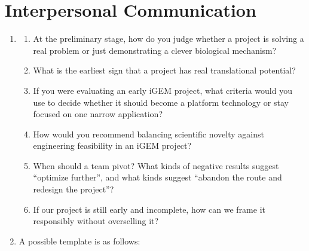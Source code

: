 \documentclass[12pt,a4paper]{article}
\begin{document}
\section{Interpersonal Communication}
\begin{enumerate}[parsep=0.5\baselineskip] 
  \item 
  \begin{enumerate}
    \item At the preliminary stage, how do you judge whether a project is solving a real problem or just demonstrating a clever biological mechanism?
    \item What is the earliest sign that a project has real translational potential?
    \item If you were evaluating an early iGEM project, what criteria would you use to decide whether it should become a platform technology or stay focused on one narrow application?
    \item How would you recommend balancing scientific novelty against engineering feasibility in an iGEM project?
    \item When should a team pivot? What kinds of negative results suggest ``optimize further'', and what kinds suggest ``abandon the route and redesign the project''?
    \item If our project is still early and incomplete, how can we frame it responsibly without overselling it? 
  \end{enumerate}
  \item A possible template is as follows:
  
\end{enumerate}
\end{document}
